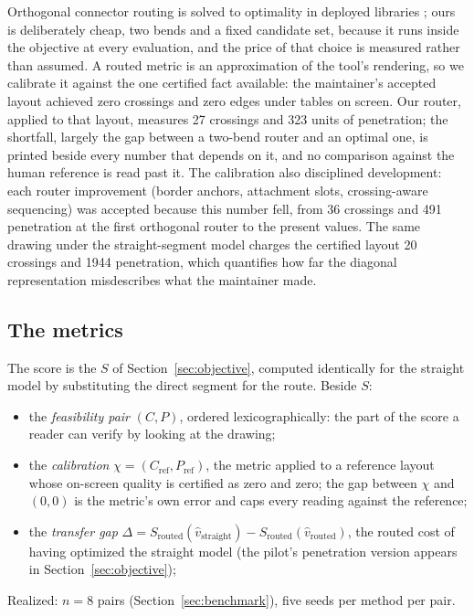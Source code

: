 \documentclass[11pt]{article}
\begin{document}
Orthogonal connector routing is solved to optimality in deployed libraries \cite{wms09};
ours is deliberately cheap, two bends and a fixed candidate set, because it runs inside the
objective at every evaluation, and the price of that choice is measured rather than
assumed. A routed metric is an approximation of the tool's rendering, so we calibrate it
against the one certified fact available: the maintainer's accepted layout achieved zero
crossings and zero edges under tables on screen. Our router, applied to that layout,
measures 27 crossings and 323 units of penetration; the shortfall, largely the gap between
a two-bend router and an optimal one, is printed beside every number that depends on it,
and no comparison against the human reference is read past it. The calibration also
disciplined development: each router improvement (border anchors, attachment slots,
crossing-aware sequencing) was accepted because this number fell, from 36 crossings and 491
penetration at the first orthogonal router to the present values. The same drawing under
the straight-segment model charges the certified layout 20 crossings and 1944 penetration,
which quantifies how far the diagonal representation misdescribes what the maintainer made.

\subsection{The metrics}\label{sec:metrics}

The score is the $S$ of Section~\ref{sec:objective}, computed identically for the straight model by substituting
the direct segment for the route. Beside $S$:
\begin{itemize}
\item the \emph{feasibility pair} $(C, P)$, ordered lexicographically: the part of the
  score a reader can verify by looking at the drawing;
\item the \emph{calibration} $\chi = (C_{\mathrm{ref}}, P_{\mathrm{ref}})$, the metric
  applied to a reference layout whose on-screen quality is certified as zero and zero; the
  gap between $\chi$ and $(0,0)$ is the metric's own error and caps every reading against
  the reference;
\item the \emph{transfer gap}
  $\Delta = S_{\mathrm{routed}}(\hat v_{\mathrm{straight}}) -
             S_{\mathrm{routed}}(\hat v_{\mathrm{routed}})$,
  the routed cost of having optimized the straight model (the pilot's penetration version
  appears in Section~\ref{sec:objective});
\end{itemize}
Realized: $n = 8$ pairs (Section~\ref{sec:benchmark}), five seeds per method per pair.
\end{document}
